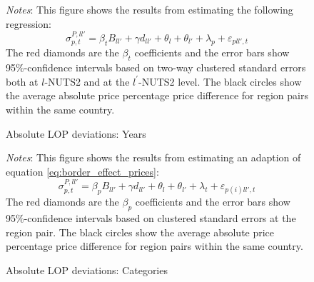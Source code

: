  \begin{figure}[H]
    \centering
    \caption{Absolute LOP deviations: Years}
    \label{fig: app_redform_sd_years}
    
     \parbox{\textwidth}{
        \begin{spacing}{1} 
            {\footnotesize 
            \textit{Notes}: This figure shows the results from estimating the following regression:
            $$ \sigma^{P,ll'}_{p,t} = \beta_t B_{ll'} + \gamma d_{ll'} + \theta_l + \theta_{l'} +\lambda_{p} + \varepsilon_{pll',t}$$ 
            The red diamonds are the $\beta_{t}$ coefficients and the error bars show 95\%-confidence intervals based on two-way clustered standard errors both at $l$-NUTS2 and at the $l^{'}$-NUTS2 level. The black circles show the average absolute price percentage price difference for region pairs within the same country.}
        \end{spacing}}
 \end{figure} 

 \begin{figure}[H]
    \centering
    \caption{Absolute LOP deviations: Categories}
    \label{fig: app_redform_sd_cats}
    
     \parbox{\textwidth}{
        \begin{spacing}{1} 
            {\footnotesize 
            \textit{Notes}: This figure shows the results from estimating an adaption of equation \ref{eq:border_effect_prices}:$$\sigma^{P,ll'}_{p,t} = \beta_p B_{ll'} + \gamma d_{ll'} + \theta_l + \theta_{l'} +\lambda_{t} + \varepsilon_{p(i)ll',t}$$The red diamonds are the $\beta_{p}$ coefficients and the error bars show 95\%-confidence intervals based on clustered standard errors at the region pair. The black circles show the average absolute price percentage price difference for region pairs within the same country.}
        \end{spacing}}
 \end{figure} 

